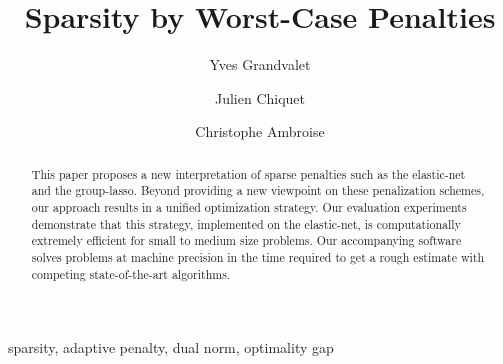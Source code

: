 \documentclass[review,authoryear]{elsarticle}
\begin{document}
\begin{frontmatter}





\title{Sparsity by Worst-Case Penalties}

\author[label1]{Yves Grandvalet}
\author[label2]{Julien Chiquet}
\author[label3]{Christophe Ambroise}
\address[label1]{Sorbonne universit\'es, Universit\'e de technologie de Compi\`egne, CNRS, \\ Heudiasyc UMR 7253, CS 60 319, 60 203 Compi\`egne cedex, France}
\address[label2]{AgroParisTech, INRA, Universit\'e Paris-Saclay\\UMR MIA-Paris, 16 rue Claude Bernard, 75005, Paris, France}
\address[label3]{Universit\'e d'\'Evry Val d'Essonne, Universit\'e Paris-Saclay,  ENSIIE, USC INRA\\ UMR CNRS 8071, LaMME, 91000 \'Evry, France}

\begin{abstract}%
  This paper proposes a new interpretation of sparse penalties such as
  the elastic-net and the group-lasso.  Beyond providing a new
  viewpoint on these penalization schemes, our approach results in a
  unified optimization strategy.  Our evaluation experiments
  demonstrate that this strategy, implemented on the elastic-net, is
  computationally extremely efficient for small to medium size
  problems.  Our accompanying software solves problems at machine
  precision in the time required to get a rough estimate with
  competing state-of-the-art algorithms.
\end{abstract} 

\begin{keyword}
  sparsity, adaptive penalty, dual norm, optimality gap
\end{keyword}

\end{frontmatter}











 



\appendix


\end{document}
